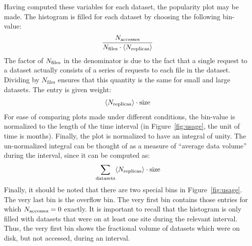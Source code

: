 Having computed these variables for each dataset, the popularity plot may be
made. The histogram is filled for each dataset by choosing the following
bin-value:
%
\begin{equation}
  \dfrac{N_\text{accesses}}{N_\text{files}\cdot \langle N_\text{replicas}\rangle}
\end{equation}
%
The factor of $N_\text{files}$ in the denominator is due to the fact that a single request
to a dataset actually consists of a series of requests to each file in the
dataset. Dividing by $N_\text{files}$ ensures that this quantity is the same for
small and large datasets. The entry is given weight:
%
\begin{equation}
  \langle N_\text{replicas}\rangle\cdot \text{size}
\end{equation}
%
For ease of comparing plots made under different conditions, the bin-value is
normalized to the length of the time interval (in Figure~\ref{fig:usage}, the unit of time is
months). Finally, the plot is normalized to have an integral of unity. The
un-normalized integral can be thought of as a measure of ``average data volume''
during the interval, since it can be computed as:
%
\begin{equation}
  \sum_\text{datasets} \langle N_\text{replicas}\rangle \cdot \text{size}
\end{equation}
%
Finally, it should be noted that there are two special bins in
Figure~\ref{fig:usage}. The very last bin is the overflow bin. The very first
bin contains those entries for which $N_\text{accesses}=0$ exactly. It is important to recall
that the histogram is only filled with datasets that were on at least one site
during the relevant interval. Thus, the very first bin shows the fractional
volume of datasets which were on disk, but not accessed, during an interval.

